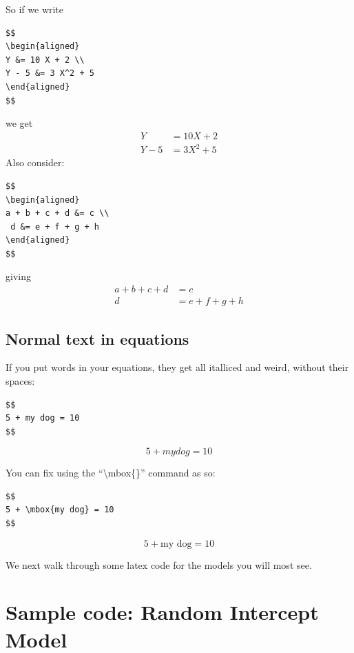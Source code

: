 \documentclass[
  letterpaper,
  DIV=11,
  numbers=noendperiod]{scrreprt}
\begin{document}
So if we write

\begin{verbatim}
$$
\begin{aligned}
Y &= 10 X + 2 \\
Y - 5 &= 3 X^2 + 5
\end{aligned}
$$
\end{verbatim}

we get \[
\begin{aligned}
Y &= 10 X + 2 \\
Y - 5 &= 3 X^2 + 5
\end{aligned}
\] Also consider:

\begin{verbatim}
$$
\begin{aligned}
a + b + c + d &= c \\
 d &= e + f + g + h 
\end{aligned}
$$
\end{verbatim}

giving \[
\begin{aligned}
a + b + c + d &= c \\
 d &= e + f + g + h 
\end{aligned}
\]

\subsection{Normal text in equations}\label{normal-text-in-equations}

If you put words in your equations, they get all italliced and weird,
without their spaces:

\begin{verbatim}
$$
5 + my dog = 10
$$
\end{verbatim}

\[
5 + my dog = 10
\]

You can fix using the ``\textbackslash mbox\{\}'' command as so:

\begin{verbatim}
$$
5 + \mbox{my dog} = 10
$$
\end{verbatim}

\[
5 + \mbox{my dog} = 10
\]

We next walk through some latex code for the models you will most see.

\section{Sample code: Random Intercept
Model}\label{sample-code-random-intercept-model}
\end{document}
